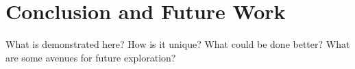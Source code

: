 \chapter{Conclusion and Future Work}


What is demonstrated here?
How is it unique?
What could be done better?
What are some avenues for future exploration?